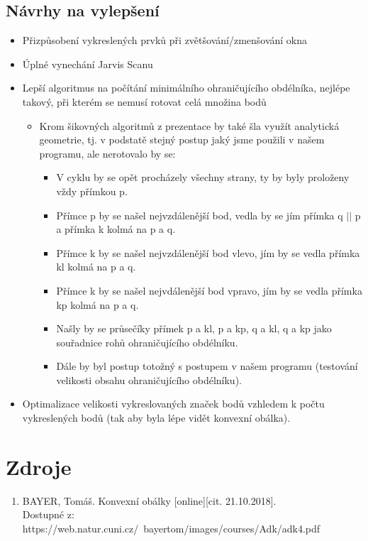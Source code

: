 \documentclass[a4paper, 12pt]{article}
\begin{document}
\subsection{Návrhy na vylepšení}
\begin{itemize}
	\item Přizpůsobení vykreslených prvků při zvětšování/zmenšování okna
	\item Úplné vynechání Jarvis Scanu
	\item Lepší algoritmus na počítání minimálního ohraničujícího obdélníka, nejlépe takový, při kterém se nemusí rotovat celá množina bodů
		\begin{itemize}
			\item Krom šikovných algoritmů z prezentace by také šla využít analytická geometrie, tj. v podstatě stejný postup jaký jsme použili v našem programu, ale nerotovalo by se:
				\begin{itemize}
					\item V cyklu by se opět procházely všechny strany, ty by byly proloženy vždy přímkou p. 
					\item Přímce p by se našel nejvzdálenější bod, vedla by se jím přímka q $||$ p a přímka k kolmá na p a q.
					\item Přímce k by se našel nejvzdálenější bod vlevo, jím by se vedla přímka kl kolmá na p a q.
					\item Přímce k by se našel nejvdálenější bod vpravo, jím by se vedla přímka kp kolmá na p a q.
					\item Našly by se průsečíky přímek p a kl, p a kp, q a kl, q a kp jako souřadnice rohů ohraničujícího obdélníku.
					\item Dále by byl postup totožný s postupem v našem programu (testování velikosti obsahu ohraničujícího obdélníku).
				\end{itemize}
		\end{itemize}
	\item Optimalizace velikosti vykreslovaných značek bodů vzhledem k počtu vykreslených bodů (tak aby byla lépe vidět konvexní obálka).
\end{itemize}

\clearpage
\section{Zdroje}

\begin{enumerate}
\item  BAYER, Tomáš. Konvexní obálky [online][cit. 21.10.2018]. \\
Dostupné z: https://web.natur.cuni.cz/~bayertom/images/courses/Adk/adk4.pdf  \\
\end{enumerate}
\end{document}

